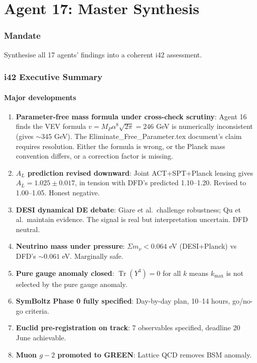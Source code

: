 \documentclass[11pt,a4paper]{article}
\newcommand{\Tr}{\operatorname{Tr}}
\begin{document}
\part{Agent 17: Master Synthesis}
\label{part:agent17}

\section{Mandate}

Synthesise all 17 agents' findings into a coherent i42 assessment.

\section{i42 Executive Summary}

\subsection{Major developments}

\begin{enumerate}
\item \textbf{Parameter-free mass formula under cross-check scrutiny}: Agent 16 finds the VEV formula $v = M_P \alpha^8 \sqrt{2\pi} = 246$ GeV is numerically inconsistent (gives $\sim$345 GeV). The Eliminate\_Free\_Parameter.tex document's claim requires resolution. Either the formula is wrong, or the Planck mass convention differs, or a correction factor is missing.

\item \textbf{$A_L$ prediction revised downward}: Joint ACT+SPT+Planck lensing gives $A_L = 1.025 \pm 0.017$, in tension with DFD's predicted 1.10--1.20. Revised to 1.00--1.05. Honest negative.

\item \textbf{DESI dynamical DE debate}: Giare et al.\ challenge robustness; Qu et al.\ maintain evidence. The signal is real but interpretation uncertain. DFD neutral.

\item \textbf{Neutrino mass under pressure}: $\Sigma m_\nu < 0.064$ eV (DESI+Planck) vs DFD's $\sim 0.061$ eV. Marginally safe.

\item \textbf{Pure gauge anomaly closed}: $\Tr(Y^3) = 0$ for all $k$ means $k_{\max}$ is not selected by the pure gauge anomaly.

\item \textbf{SymBoltz Phase 0 fully specified}: Day-by-day plan, 10--14 hours, go/no-go criteria.

\item \textbf{Euclid pre-registration on track}: 7 observables specified, deadline 20 June achievable.

\item \textbf{Muon $g-2$ promoted to GREEN}: Lattice QCD removes BSM anomaly.
\end{enumerate}
\end{document}
